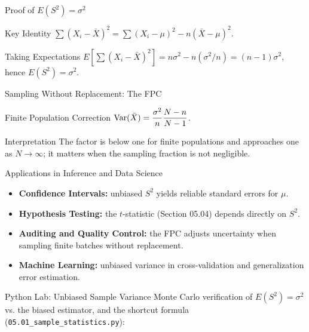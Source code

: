 \documentclass[aspectratio=169,xcolor={dvipsnames,table}]{beamer}
\begin{document}
\begin{frame}{Proof of $E(S^2)=\sigma^2$}
  \footnotesize
  \begin{block}{Key Identity}
    $\sum(X_i-\bar X)^2 = \sum(X_i-\mu)^2 - n(\bar X-\mu)^2$.
  \end{block}
  \pause
  \begin{alertblock}{Taking Expectations}
    $E[\sum(X_i-\bar X)^2] = n\sigma^2 - n(\sigma^2/n) = (n-1)\sigma^2$, hence $E(S^2)=\sigma^2$.
  \end{alertblock}
\end{frame}

\begin{frame}{Sampling Without Replacement: The FPC}
  \footnotesize
  \begin{block}{Finite Population Correction}
    $\operatorname{Var}(\bar X) = \dfrac{\sigma^2}{n}\dfrac{N-n}{N-1}$.
  \end{block}
  \pause
  \begin{alertblock}{Interpretation}
    The factor is below one for finite populations and approaches one as $N\to\infty$; it matters when the sampling fraction is not negligible.
  \end{alertblock}
\end{frame}
\begin{frame}{Applications in Inference and Data Science}
	\vspace{-0.1cm}
	\begin{itemize}\itemsep=0.1cm
		\item \textbf{Confidence Intervals:} unbiased $S^2$ yields reliable standard errors for $\mu$. \pause
		\item \textbf{Hypothesis Testing:} the $t$-statistic (Section 05.04) depends directly on $S^2$. \pause
		\item \textbf{Auditing and Quality Control:} the FPC adjusts uncertainty when sampling finite batches without replacement. \pause
		\item \textbf{Machine Learning:} unbiased variance in cross-validation and generalization error estimation.
	\end{itemize}
\end{frame}

\begin{frame}[fragile]{Python Lab: Unbiased Sample Variance}
	\vspace{-0.05cm}
	\scriptsize
	Monte Carlo verification of $E(S^2)=\sigma^2$ vs. the biased estimator, and the shortcut formula (\texttt{05.01\_sample\_statistics.py}):
	{
	}
\end{frame}
\end{document}
